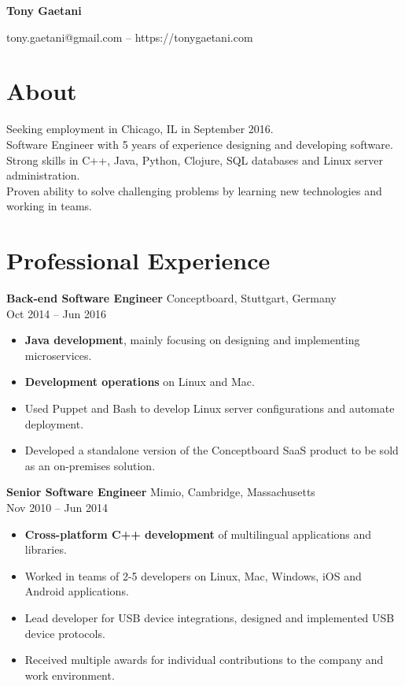 \documentclass{article}
\begin{document}
\begin{center}
{\LARGE\bf Tony Gaetani}\\
\end{center}
\begin{center}
tony.gaetani@gmail.com -- https://tonygaetani.com
\end{center}

\section*{About}
Seeking employment in Chicago, IL in September 2016.\\
Software Engineer with 5 years of experience designing and developing software.\\
Strong skills in C++, Java, Python, Clojure, SQL databases and Linux server administration.\\
Proven ability to solve challenging problems by learning new technologies and working in teams.\\
\section*{Professional Experience}
{\bf Back-end Software Engineer} Conceptboard, Stuttgart, Germany\\
Oct 2014 -- Jun 2016
\begin{itemize}
  \itemsep0em
  \item {\bf Java development}, mainly focusing on designing and implementing microservices.
  \item {\bf Development operations} on Linux and Mac.
  \item Used Puppet and Bash to develop Linux server configurations and automate deployment.
  \item Developed a standalone version of the Conceptboard SaaS product to be sold as an on-premises solution.
\end{itemize}
{\bf Senior Software Engineer} Mimio, Cambridge, Massachusetts\\
Nov 2010 -- Jun 2014
\begin{itemize}
  \itemsep0em
  \item {\bf Cross-platform C++ development} of multilingual applications and libraries.
  \item Worked in teams of 2-5 developers on Linux, Mac, Windows, iOS and Android applications.
  \item Lead developer for USB device integrations, designed and implemented USB device protocols.
  \item Received multiple awards for individual contributions to the company and work environment.\\
\end{itemize}
\end{document}
